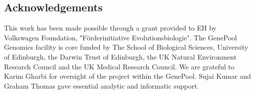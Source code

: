 \documentclass[10pt]{bmc_article}
\newenvironment{bmcformat}{\begin{raggedright}\baselineskip20pt\sloppy\setboolean{publ}{false}}{\end{raggedright}\baselineskip20pt\sloppy}
\begin{document}
\begin{bmcformat}
\section*{Acknowledgements}

This work has been made possible through a grant provided to EH by
Volkswagen Foundation, "F\"{o}rderinitiative Evolutionsbiologie". The
GenePool Genomics facility is core funded by The School of Biological
Sciences, University of Edinburgh, the Darwin Trust of Edinburgh, the
UK Natural Environment Research Council and the UK Medical Research
Council. We are grateful to Karim Gharbi for oversight of the project
within the GenePool. Sujai Kumar and Graham Thomas gave essential
analytic and informatic support.


{
  
} %


\newpage



\end{bmcformat}
\end{document}
